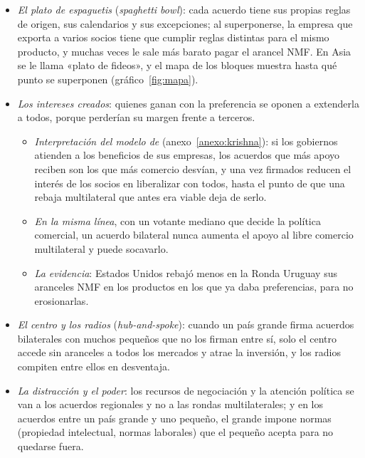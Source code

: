 \documentclass[11pt]{article}
\begin{document}
\begin{itemize}
\item \emph{El plato de espaguetis} (\emph{spaghetti bowl}): cada acuerdo tiene sus propias reglas de origen, sus calendarios y sus excepciones; al superponerse, la empresa que exporta a varios socios tiene que cumplir reglas distintas para el mismo producto, y muchas veces le sale más barato pagar el arancel NMF\nocite{Bhagwati1995Infatuation,Bhagwati2008Termites}. En Asia se le llama «plato de fideos»\nocite{KawaiWignaraja2011}, y el mapa de los bloques muestra hasta qué punto se superponen (gráfico~\ref{fig:mapa}).
\item \emph{Los intereses creados}: quienes ganan con la preferencia se oponen a extenderla a todos, porque perderían su margen frente a terceros.
  \begin{itemize}
  \item \emph{Interpretación del modelo de } (anexo~\ref{anexo:krishna}): si los gobiernos atienden a los beneficios de sus empresas, los acuerdos que más apoyo reciben son los que más comercio desvían, y una vez firmados reducen el interés de los socios en liberalizar con todos, hasta el punto de que una rebaja multilateral que antes era viable deja de serlo\nocite{Krishna1998}.
  \item \emph{En la misma línea}, con un votante mediano que decide la política comercial, un acuerdo bilateral nunca aumenta el apoyo al libre comercio multilateral y puede socavarlo\nocite{Levy1997}.
  \item \emph{La evidencia}: Estados Unidos rebajó menos en la Ronda Uruguay sus aranceles NMF en los productos en los que ya daba preferencias, para no erosionarlas\nocite{Limao2006}.
  \end{itemize}
\item \emph{El centro y los radios} (\emph{hub-and-spoke}): cuando un país grande firma acuerdos bilaterales con muchos pequeños que no los firman entre sí, solo el centro accede sin aranceles a todos los mercados y atrae la inversión, y los radios compiten entre ellos en desventaja\nocite{KowalczykWonnacott1992}.
\item \emph{La distracción y el poder}: los recursos de negociación y la atención política se van a los acuerdos regionales y no a las rondas multilaterales; y en los acuerdos entre un país grande y uno pequeño, el grande impone normas (propiedad intelectual, normas laborales) que el pequeño acepta para no quedarse fuera\nocite{Bhagwati2008Termites}.
\end{itemize}
\end{document}
